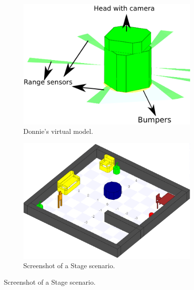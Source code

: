 \begin{figure}[h!]
    \centering
    \begin{subfigure}[b]{0.7\linewidth}
        \centering
        \includegraphics[width=\linewidth]{figs/donnie-simul.png}
        \caption{Donnie's virtual model.}
        \label{fig:donnie-simul}
    \end{subfigure}

    \begin{subfigure}[b]{0.7\linewidth}
        \centering
        \includegraphics[width=\linewidth]{figs/stage-env.png}
        \caption{Screenshot of a Stage scenario.}
        \label{fig:stage-screen}
    \end{subfigure}

    

\end{figure}
